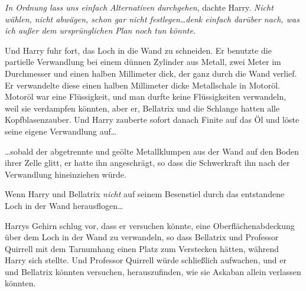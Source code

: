 \emph{In Ordnung lass uns einfach Alternativen} \emph{durchgehen}, dachte Harry. \emph{Nicht wählen, nicht abwägen, schon gar nicht festlegen…denk einfach darüber nach, was ich außer dem ursprünglichen Plan noch tun könnte.}

Und Harry fuhr fort, das Loch in die Wand zu schneiden. Er benutzte die partielle Verwandlung bei einem dünnen Zylinder aus Metall, zwei Meter im Durchmesser und einen halben Millimeter dick, der ganz durch die Wand verlief. Er verwandelte diese einen halben Millimeter dicke Metallschale in Motoröl. Motoröl war eine Flüssigkeit, und man durfte keine Flüssigkeiten verwandeln, weil sie verdampfen könnten, aber er, Bellatrix und die Schlange hatten alle Kopfblasenzauber. Und Harry zauberte sofort danach Finite auf das Öl und löste seine eigene Verwandlung auf…

…sobald der abgetrennte und geölte Metallklumpen aus der Wand auf den Boden ihrer Zelle glitt, er hatte ihn angeschrägt, so dass die Schwerkraft ihn nach der Verwandlung hineinziehen würde.

Wenn Harry und Bellatrix \emph{nicht} auf seinem Besenstiel durch das entstandene Loch in der Wand herausflogen…

Harrys Gehirn schlug vor, dass er versuchen könnte, eine Oberflächenabdeckung über dem Loch in der Wand zu verwandeln, so dass Bellatrix und Professor Quirrell mit dem Tarnumhang einen Platz zum Verstecken hätten, während Harry sich stellte. Und Professor Quirrell würde schließlich aufwachen, und er und Bellatrix könnten versuchen, herauszufinden, wie sie Askaban allein verlassen könnten.

